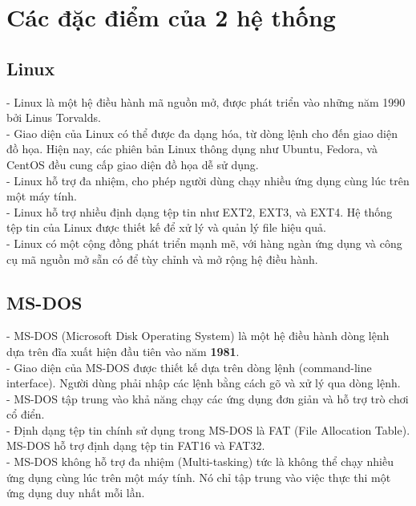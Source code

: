 \documentclass[12pt,a4paper]{article}
\begin{document}
\section{Các đặc điểm của 2 hệ thống}
\subsection{Linux}
- Linux là một hệ điều hành mã nguồn mở, được phát triển vào những năm 1990 bởi Linus Torvalds.\\

- Giao diện của Linux có thể được đa dạng hóa, từ dòng lệnh cho đến giao diện đồ họa. Hiện nay, các phiên bản Linux thông dụng như Ubuntu, Fedora, và CentOS đều cung cấp giao diện đồ họa dễ sử dụng.\\

- Linux hỗ trợ đa nhiệm, cho phép người dùng chạy nhiều ứng dụng cùng lúc trên một máy tính.\\

- Linux hỗ trợ nhiều định dạng tệp tin như EXT2, EXT3, và EXT4. Hệ thống tệp tin của Linux được thiết kế để xử lý và quản lý file hiệu quả.\\

- Linux có một cộng đồng phát triển mạnh mẽ, với hàng ngàn ứng dụng và công cụ mã nguồn mở sẵn có để tùy chỉnh và mở rộng hệ điều hành.

\subsection{MS-DOS}
- MS-DOS (Microsoft Disk Operating System) là một hệ điều hành dòng lệnh dựa trên đĩa xuất hiện đầu tiên vào năm \textbf{1981}.\\

- Giao diện của MS-DOS được thiết kế dựa trên dòng lệnh (command-line interface). Người dùng phải nhập các lệnh bằng cách gõ và xử lý qua dòng lệnh.\\

- MS-DOS tập trung vào khả năng chạy các ứng dụng đơn giản và hỗ trợ trò chơi cổ điển.\\

- Định dạng tệp tin chính sử dụng trong MS-DOS là FAT (File Allocation Table). MS-DOS hỗ trợ định dạng tệp tin FAT16 và FAT32.\\

- MS-DOS không hỗ trợ đa nhiệm (Multi-tasking) tức là không thể chạy nhiều ứng dụng cùng lúc trên một máy tính. Nó chỉ tập trung vào việc thực thi một ứng dụng duy nhất mỗi lần.
\end{document}
